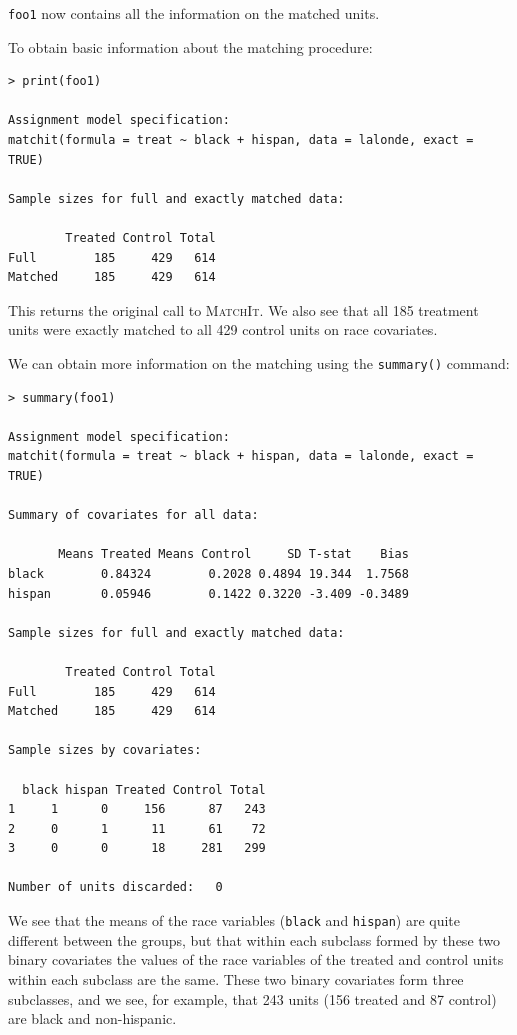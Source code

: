 \documentclass[oneside,letterpaper,titlepage]{article}
\newcommand{\MatchIt}{\textsc{MatchIt}}
\begin{document}
\texttt{foo1} now contains all the information on the matched units.  

To obtain basic information about the matching procedure: 

\begin{verbatim}
> print(foo1)
 
Assignment model specification:
matchit(formula = treat ~ black + hispan, data = lalonde, exact = TRUE)
 
Sample sizes for full and exactly matched data:
 
        Treated Control Total
Full        185     429   614
Matched     185     429   614
\end{verbatim} 
 
This returns the original call to \MatchIt.  We also see that all 185
treatment units were exactly matched to all 429 control units on race
covariates.  

We can obtain more information on the matching using the {\tt summary()} command:

\begin{verbatim}
> summary(foo1)
 
Assignment model specification:
matchit(formula = treat ~ black + hispan, data = lalonde, exact = TRUE)
 
Summary of covariates for all data:
 
       Means Treated Means Control     SD T-stat    Bias
black        0.84324        0.2028 0.4894 19.344  1.7568
hispan       0.05946        0.1422 0.3220 -3.409 -0.3489
  
Sample sizes for full and exactly matched data:
 
        Treated Control Total
Full        185     429   614
Matched     185     429   614
 
Sample sizes by covariates:
 
  black hispan Treated Control Total
1     1      0     156      87   243
2     0      1      11      61    72
3     0      0      18     281   299
 
Number of units discarded:   0
\end{verbatim}

We see that the means of the race variables ({\tt black} and {\tt hispan}) are quite different between the groups, but
that within each subclass formed by these two binary covariates the values of the race variables of the treated and control units within each subclass are the same. 
These two binary covariates form three subclasses, and we see, for example, that 243 units (156 treated and 87 control) are black and non-hispanic.
\end{document}
